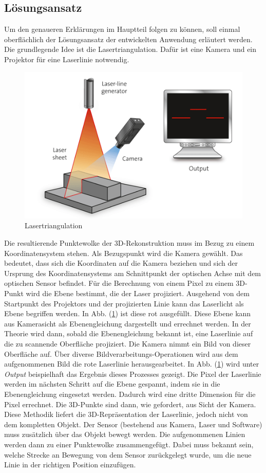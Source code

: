 	\subsection{Lösungsansatz}
	Um den genaueren Erklärungen im Hauptteil folgen zu können, soll einmal oberflächlich der Lösungsansatz der entwickelten Anwendung erläutert werden. Die grundlegende Idee ist die Lasertriangulation. Dafür ist eine Kamera und ein Projektor für eine Laserlinie notwendig.
	\begin{figure}[h]
		\centering
		\includegraphics[width=0.7\linewidth]{img/grundlagen/lasertriangulation_1}
		\caption{Lasertriangulation}
		\label{fig:lasertriangulation}
	\end{figure}

	Die resultierende Punktewolke der 3D-Rekonstruktion muss im Bezug zu einem Koordinatensystem stehen. Als Bezugspunkt wird die Kamera gewählt. Das bedeutet, dass sich die Koordinaten auf die Kamera beziehen und sich der Ursprung des Koordinatensystems am Schnittpunkt der optischen Achse mit dem optischen Sensor befindet. Für die Berechnung von einem Pixel zu einem 3D-Punkt wird die Ebene bestimmt, die der Laser projiziert. Ausgehend von dem Startpunkt des Projektors und der projizierten Linie kann das Laserlicht als Ebene begriffen werden. In Abb. (\ref{fig:lasertriangulation}) ist diese rot ausgefüllt. Diese Ebene kann aus Kamerasicht als Ebenengleichung dargestellt und errechnet werden. In der Theorie wird dann, sobald die Ebenengleichung bekannt ist, eine Laserlinie auf die zu scannende Oberfläche projiziert. Die Kamera nimmt ein Bild von dieser Oberfläche auf. Über diverse Bildverarbeitungs-Operationen wird aus dem aufgenommenen Bild die rote Laserlinie herausgearbeitet. In Abb. (\ref{fig:lasertriangulation}) wird unter \emph{Output} beispielhaft das Ergebnis dieses Prozesses gezeigt. Die Pixel der Laserlinie werden im nächsten Schritt auf die Ebene gespannt, indem sie in die Ebenengleichung eingesetzt werden. Dadurch wird eine dritte Dimension für die Pixel errechnet. Die 3D-Punkte sind dann, wie gefordert, aus Sicht der Kamera. Diese Methodik liefert die 3D-Repräsentation der Laserlinie, jedoch nicht von dem kompletten Objekt. Der Sensor (bestehend aus Kamera, Laser und Software) muss zusätzlich über das Objekt bewegt werden. Die aufgenommenen Linien werden dann zu einer Punktewolke zusammengefügt. Dabei muss bekannt sein, welche Strecke an Bewegung von dem Sensor zurückgelegt wurde, um die neue Linie in der richtigen Position einzufügen. 

